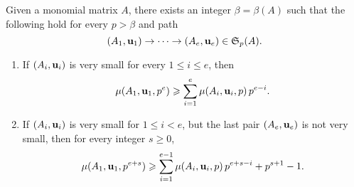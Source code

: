 \documentclass[11pt]{amsart}
\begin{document}
%
% 
\begin{corollary}\label{cor: iterated lifting}
Given a monomial matrix $A$, there exists an integer $\beta = \beta(A)$ such that the following hold for every $p > \beta$ and path \[ (A_1, \mathbf{u}_1) \to \cdots \to (A_e, \mathbf{u}_e)  \in \mathfrak{S}_p(A).\]  
\begin{enumerate}
\item If $(A_i, \mathbf{u}_i)$ is very small for every $1 \leq i \leq e$, then \[ \mu(A_1, \mathbf{u}_1, p^e) \geqslant \sum_{i=1}^e \mu(A_i, \mathbf{u}_i, p) \, p^{e-i}.\] 
\item If $(A_i, \mathbf{u}_i)$ is very small for $1 \leq i < e$, but the last pair $(A_e, \mathbf{u}_e)$ is not very small, then for every integer $s \geq 0$, 
 \[ \mu(A_1, \mathbf{u}_1, p^{e+s}) \geqslant \sum_{i=1}^{e-1} \mu(A_i, \mathbf{u}_i, p) \, p^{e+s-i} + p^{s+1}-1. \]
\end{enumerate}
\end{corollary}

\end{document}
